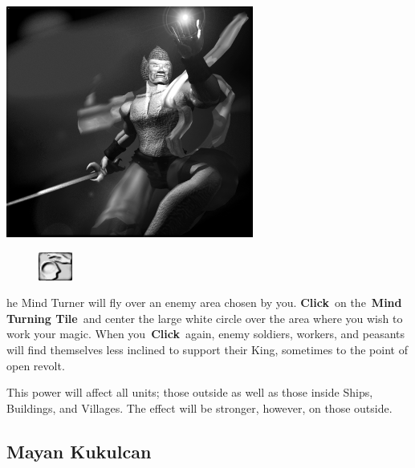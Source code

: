 \begin{center}
	\includegraphics[width=1\linewidth]{Amindturner}
\end{center}

\begin{figure}
	\vspace{-20pt}
	\begin{center}
		\includegraphics[width=0.1\textwidth]{Tmindturn}
	\end{center}
	\vspace{-20pt}
\end{figure}

he Mind Turner will fly over an enemy area chosen by you. \textbf{Click} on the \textbf{Mind Turning Tile} and center the large white circle over the area where you wish to work your magic. When you \textbf{Click} again, enemy soldiers, workers, and peasants will find themselves less inclined to support their King, sometimes to the point of open revolt.

This power will affect all units; those outside as well as those inside Ships, Buildings, and Villages. The effect will be stronger, however, on those outside.

\subsection{Mayan Kukulcan}

